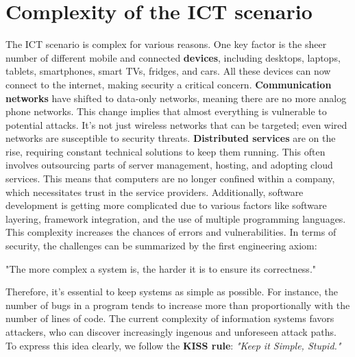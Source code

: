\section{Complexity of the ICT scenario}
The ICT scenario is complex for various reasons. One key factor is the sheer number of different mobile and connected \textbf{devices}, including desktops, laptops, tablets, smartphones, smart TVs, fridges, and cars. All these devices can now connect to the internet, making security a critical concern.
\textbf{Communication networks } have shifted to data-only networks, meaning there are no more analog phone networks. This change implies that almost everything is vulnerable to potential attacks. It's not just wireless networks that can be targeted; even wired networks are susceptible to security threats.
\textbf{Distributed services} are on the rise, requiring constant technical solutions to keep them running. This often involves outsourcing parts of server management, hosting, and adopting cloud services. This means that computers are no longer confined within a company, which necessitates trust in the service providers. Additionally, software development is getting more complicated due to various factors like software layering, framework integration, and the use of multiple programming languages. This complexity increases the chances of errors and vulnerabilities.
In terms of security, the challenges can be summarized by the first engineering axiom:
\begin{center}
    "The more complex a system is, the harder it is to ensure its correctness."    
\end{center}
Therefore, it's essential to keep systems as simple as possible. For instance, the number of bugs in a program tends to increase more than proportionally with the number of lines of code. The current complexity of information systems favors attackers, who can discover increasingly ingenous and unforeseen attack paths.\\ 
To express this idea clearly, we follow the \textbf{KISS rule}: \emph{"Keep it Simple, Stupid."}




